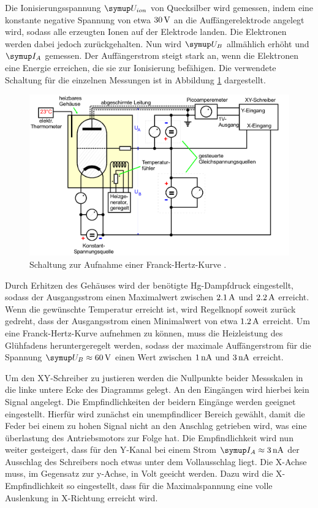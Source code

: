 Die Ionisierungsspannung $\su{U_{ion}}$ von Quecksilber wird gemessen, indem eine
konstante negative Spannung von etwa $30\,\si{\volt}$ an die Auffängerelektrode angelegt
wird, sodass alle erzeugten Ionen auf der Elektrode landen. Die Elektronen werden
dabei jedoch zurückgehalten.
Nun wird $\su{U_B}$ allmählich erhöht und $\su{I_A}$ gemessen. Der Auffängerstrom
steigt stark an, wenn die Elektronen eine Energie erreichen, die sie zur
Ionisierung befähigen.
Die verwendete Schaltung für die einzelnen Messungen ist in Abbildung \ref{fig:schalt}
dargestellt.
\begin{figure}
  \includegraphics{bilder/schalt.jpg}
  \caption{Schaltung zur Aufnahme einer Franck-Hertz-Kurve \cite{601}.}
  \label{fig:schalt}
\end{figure}
Durch Erhitzen des Gehäuses wird der benötigte Hg-Dampfdruck eingestellt, sodass
der Ausgangsstrom einen Maximalwert zwischen $2.1\,\si{\ampere}$ und $2.2\,\si{\ampere}$ erreicht.
Wenn die gewünschte Temperatur erreicht ist, wird Regelknopf soweit zurück
gedreht, dass der Ausgangsstrom einen Minimalwert von etwa $1.2\,\si{\ampere}$ erreicht.
Um eine Franck-Hertz-Kurve aufnehmen zu können, muss die Heizleistung des
Glühfadens heruntergeregelt werden, sodass der maximale Auffängerstrom für die
Spannung $\su{U_B}\approx60\Volt$ einen Wert zwischen $1\,\si{\nano\ampere}$ und $3\,\si{\nano\ampere}$ erreicht.

Um den XY-Schreiber zu justieren werden die Nullpunkte beider Messskalen in die
linke untere Ecke des Diagramms gelegt. An den Eingängen wird hierbei kein
Signal angelegt. Die Empfindlichkeiten der beidern Eingänge werden geeignet
eingestellt. Hierfür wird zunächst ein unempfindlicer Bereich gewählt, damit
die Feder bei einem zu hohen Signal nicht an den Anschlag getrieben wird, was
eine überlastung des Antriebsmotors zur Folge hat. Die Empfindlichkeit wird nun
weiter gesteigert, dass für den Y-Kanal bei einem Strom $\su{I_A}\approx3\nA$
der Ausschlag des Schreibers noch etwas unter dem Vollausschlag liegt. Die
X-Achse muss, im Gegensatz zur y-Achse, in Volt geeicht werden. Dazu wird
die X-Empfindlichkeit so eingestellt, dass für die Maximalspannung eine volle
Auslenkung in X-Richtung erreicht wird.
